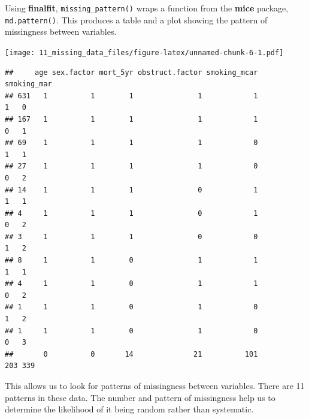 \documentclass[
  12pt,
  krantz2]{krantz}
\makeatletter
\newenvironment{Shaded}{\begin{snugshade}}{\end{snugshade}}
\newcommand{\KeywordTok}[1]{\textcolor[rgb]{0.13,0.29,0.53}{\textbf{#1}}}
\newcommand{\NormalTok}[1]{#1}
\newcommand{\OperatorTok}[1]{\textcolor[rgb]{0.81,0.36,0.00}{\textbf{#1}}}
\newcommand{\StringTok}[1]{\textcolor[rgb]{0.31,0.60,0.02}{#1}}
\newenvironment{kframe}{%
\medskip{}
\setlength{\fboxsep}{.8em}
 \def\at@end@of@kframe{}%
 \ifinner\ifhmode%
  \def\at@end@of@kframe{\end{minipage}}%
  \begin{minipage}{\columnwidth}%
 \fi\fi%
 \def\FrameCommand##1{\hskip\@totalleftmargin \hskip-\fboxsep
 \colorbox{shadecolor}{##1}\hskip-\fboxsep
     \hskip-\linewidth \hskip-\@totalleftmargin \hskip\columnwidth}%
 \MakeFramed {\advance\hsize-\width
   \@totalleftmargin\z@ \linewidth\hsize
   \@setminipage}}%
 {\par\unskip\endMakeFramed%
 \at@end@of@kframe}
\renewenvironment{Shaded}{\begin{kframe}}{\end{kframe}}
\makeatother
\begin{document}

Using \textbf{finalfit}, \texttt{missing\_pattern()} wraps a function from the \textbf{mice} package, \texttt{md.pattern()}.
This produces a table and a plot showing the pattern of missingness between variables.

\begin{Shaded}
\end{Shaded}

\texttt{[image: 11\_missing\_data\_files/figure-latex/unnamed-chunk-6-1.pdf]}

\begin{verbatim}
##     age sex.factor mort_5yr obstruct.factor smoking_mcar smoking_mar    
## 631   1          1        1               1            1           1   0
## 167   1          1        1               1            1           0   1
## 69    1          1        1               1            0           1   1
## 27    1          1        1               1            0           0   2
## 14    1          1        1               0            1           1   1
## 4     1          1        1               0            1           0   2
## 3     1          1        1               0            0           1   2
## 8     1          1        0               1            1           1   1
## 4     1          1        0               1            1           0   2
## 1     1          1        0               1            0           1   2
## 1     1          1        0               1            0           0   3
##       0          0       14              21          101         203 339
\end{verbatim}

This allows us to look for patterns of missingness between variables.
There are 11 patterns in these data.
The number and pattern of missingness help us to determine the likelihood of it being random rather than systematic.
\end{document}
